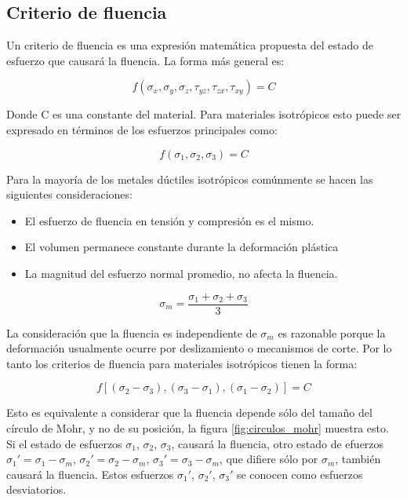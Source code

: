 \subsection{Criterio de fluencia}

Un criterio de fluencia es una expresión matemática propuesta del estado de esfuerzo que causará 
la fluencia. La forma más general es: ~\cite{hosford2005}

\begin{equation}
f(\sigma_x,\sigma_y, \sigma_z, \tau_{yz}, \tau_{zx}, \tau_{xy} ) = C 
\end{equation}

Donde C es una constante del material. Para materiales isotrópicos esto puede ser expresado en 
términos de los esfuerzos principales como: ~\cite{hosford2005}

\begin{equation}
f(\sigma_1,\sigma_2,\sigma_3 )=C
\end{equation}

Para la mayoría de los metales dúctiles isotrópicos comúnmente se hacen las siguientes 
consideraciones: ~\cite{hosford2007}


\begin{itemize}
\item El esfuerzo de fluencia en tensión y compresión es el mismo.
\item El volumen permanece constante durante la deformación plástica
\item La magnitud del esfuerzo normal promedio, no afecta la fluencia.
\end{itemize}

\begin{equation}
\sigma_m=\frac{\sigma_1+\sigma_2+\sigma_3}{3}
\end{equation}

La consideración que la fluencia es independiente de $\sigma_m$ es razonable porque la deformación 
usualmente ocurre por deslizamiento o mecanismos de corte. Por lo tanto los criterios de fluencia 
para materiales isotrópicos tienen la forma: ~\cite{hosford2007}

\begin{equation}
f[(\sigma_2-\sigma_3 ),(\sigma_3-\sigma_1 ),(\sigma_1-\sigma_2 )] = C
\end{equation}

Esto es equivalente a considerar que la fluencia depende sólo del tamaño del círculo de Mohr, 
y no de su posición, la figura \ref{fig:circulos_mohr} muestra esto. Si el estado de esfuerzos 
$\sigma_1$, $\sigma_2$, $\sigma_3$, causará la fluencia, otro estado de efuerzos 
$\sigma_1' = \sigma_1 - \sigma_m $, $\sigma_2' = \sigma_2 - \sigma_m $, $\sigma_3' = \sigma_3 - \sigma_m $, 
que difiere sólo por $\sigma_m$, también causará la fluencia. Estos esfuerzos $\sigma_1'$, $\sigma_2'$, 
$\sigma_3'$ se conocen como esfuerzos desviatorios. ~\cite{hosford2007}


